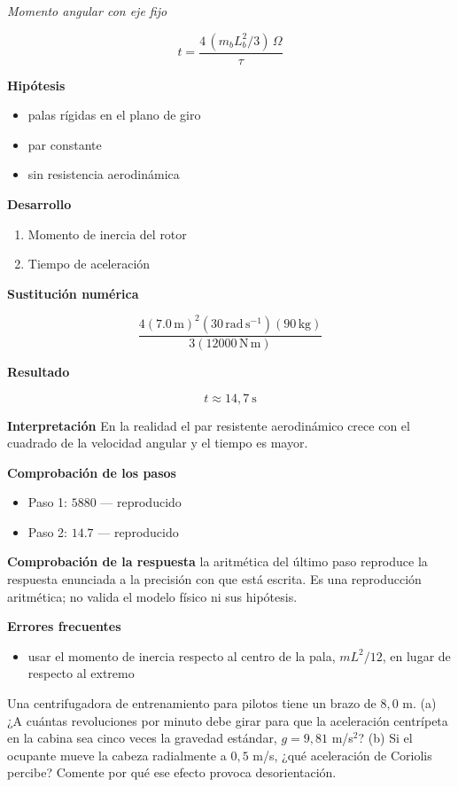 \documentclass[10pt,openany]{book}
\begin{document}
\noindent\textit{Momento angular con eje fijo}

\[
t = \frac{4\,(m_b L_b^{2}/3)\,\Omega}{\tau}
\]

\noindent\textbf{Hipótesis}
\begin{itemize}
\item palas rígidas en el plano de giro
\item par constante
\item sin resistencia aerodinámica
\end{itemize}

\noindent\textbf{Desarrollo}
\begin{enumerate}
\item
Momento de inercia del rotor
\item
Tiempo de aceleración
\end{enumerate}

\noindent\textbf{Sustitución numérica}

\[
\frac{4 \left(7.0\,\mathrm{m}\right)^{2} \left(30\,\mathrm{rad}\,\mathrm{s}^{-1}\right) \left(90\,\mathrm{kg}\right)}{3 \left(12000\,\mathrm{N}\,\mathrm{m}\right)}
\]

\noindent\textbf{Resultado}

\[
t \approx 14{,}7\ \mathrm{s}
\]

\noindent\textbf{Interpretación}
En la realidad el par resistente aerodinámico crece con el cuadrado de la velocidad angular y el tiempo es mayor.

\noindent\textbf{Comprobación de los pasos}
\begin{itemize}
\item Paso 1: $5880$ — reproducido
\item Paso 2: $14.7$ — reproducido
\end{itemize}

\noindent\textbf{Comprobación de la respuesta} la aritmética del último paso reproduce la respuesta enunciada a la precisión con que está escrita. Es una reproducción aritmética; no valida el modelo físico ni sus hipótesis.

\noindent\textbf{Errores frecuentes}
\begin{itemize}
\item usar el momento de inercia respecto al centro de la pala, \(m L^2/12\), en lugar de respecto al extremo
\end{itemize}

Una centrifugadora de entrenamiento para pilotos tiene un brazo de \(8{,}0\) m. (a) ¿A cuántas revoluciones por minuto debe girar para que la aceleración centrípeta en la cabina sea cinco veces la gravedad estándar, \(g = 9{,}81\) m/s\(^2\)? (b) Si el ocupante mueve la cabeza radialmente a \(0{,}5\) m/s, ¿qué aceleración de Coriolis percibe? Comente por qué ese efecto provoca desorientación.
\end{document}
